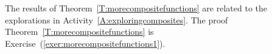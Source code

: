 \begin{activity}
%
%
%
%
%
%
%
%
%
%
%
%
%
The results of Theorem~\ref{T:morecompositefunctions} are related to the explorations in Activity~\ref{A:exploringcomposites}.  The proof Theorem~\ref{T:morecompositefunctions} is 
Exercise~(\ref{exer:morecompositefunctions1}).


\end{activity}
